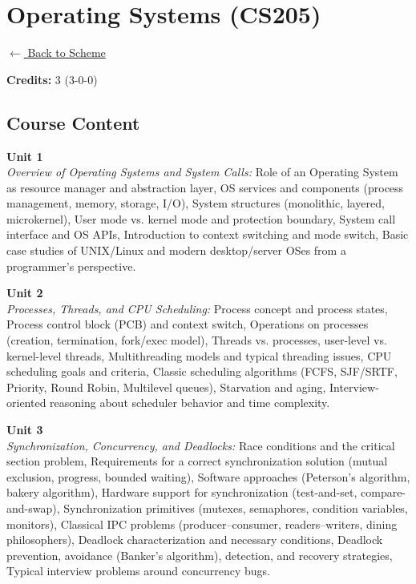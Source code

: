 \section*{Operating Systems (CS205)}
\label{course:CS205}

\noindent \small{\hyperref[main:scheme]{$\leftarrow$ Back to Scheme}} \vspace{0.5cm}

\noindent \textbf{Credits:} 3 (3-0-0)

\subsection*{Course Content}
\noindent\textbf{Unit 1} \\
\textit{Overview of Operating Systems and System Calls:} Role of an Operating System as resource manager and abstraction layer, OS services and components (process management, memory, storage, I/O), System structures (monolithic, layered, microkernel), User mode vs. kernel mode and protection boundary, System call interface and OS APIs, Introduction to context switching and mode switch, Basic case studies of UNIX/Linux and modern desktop/server OSes from a programmer’s perspective.

\vspace{0.3cm}

\noindent\textbf{Unit 2} \\
\textit{Processes, Threads, and CPU Scheduling:} Process concept and process states, Process control block (PCB) and context switch, Operations on processes (creation, termination, fork/exec model), Threads vs. processes, user-level vs. kernel-level threads, Multithreading models and typical threading issues, CPU scheduling goals and criteria, Classic scheduling algorithms (FCFS, SJF/SRTF, Priority, Round Robin, Multilevel queues), Starvation and aging, Interview-oriented reasoning about scheduler behavior and time complexity.

\vspace{0.3cm}

\noindent\textbf{Unit 3} \\
\textit{Synchronization, Concurrency, and Deadlocks:} Race conditions and the critical section problem, Requirements for a correct synchronization solution (mutual exclusion, progress, bounded waiting), Software approaches (Peterson’s algorithm, bakery algorithm), Hardware support for synchronization (test-and-set, compare-and-swap), Synchronization primitives (mutexes, semaphores, condition variables, monitors), Classical IPC problems (producer–consumer, readers–writers, dining philosophers), Deadlock characterization and necessary conditions, Deadlock prevention, avoidance (Banker’s algorithm), detection, and recovery strategies, Typical interview problems around concurrency bugs.

